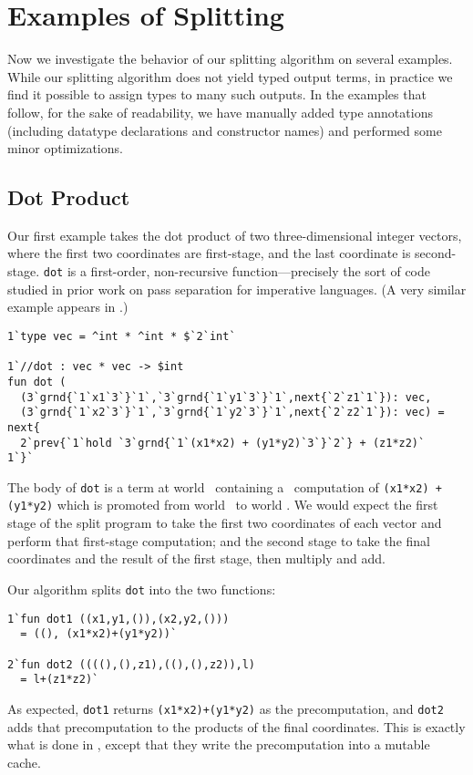  \section{Examples of Splitting}
\label{sec:examples}

Now we investigate the behavior of our splitting algorithm on several examples.
While our splitting algorithm does not yield typed output terms, in practice we
find it possible to assign types to many such outputs. In the examples that
follow, for the sake of readability, we have manually added type annotations
(including datatype declarations and constructor names) and performed some minor
optimizations.

\subsection{Dot Product}

Our first example takes the dot product of two three-dimensional integer
vectors, where the first two coordinates are first-stage, and the last
coordinate is second-stage. \texttt{dot} is a first-order, non-recursive
function---precisely the sort of code studied in prior work on pass separation
for imperative languages. (A very similar example appears in \cite{knoblock96}.)
%
\begin{lstlisting} 
1`type vec = ^int * ^int * $`2`int`

1`//dot : vec * vec -> $int
fun dot (
  (3`grnd{`1`x1`3`}`1`,`3`grnd{`1`y1`3`}`1`,next{`2`z1`1`}): vec,
  (3`grnd{`1`x2`3`}`1`,`3`grnd{`1`y2`3`}`1`,next{`2`z2`1`}): vec) = 
next{
  2`prev{`1`hold `3`grnd{`1`(x1*x2) + (y1*y2)`3`}`2`} + (z1*z2)`
1`}`
\end{lstlisting}
%
The body of \texttt{dot} is a \rmint{} term at world \bbtwo\ containing a
\rmint\ computation of \texttt{(x1*x2) + (y1*y2)} which is promoted from world
\bbonep\ to world \bbtwo. We would expect the first stage of the split program
to take the first two coordinates of each vector and perform that first-stage
computation; and the second stage to take the final coordinates and the result
of the first stage, then multiply and add.

Our algorithm splits \texttt{dot} into the two functions:
%
\begin{lstlisting} 
1`fun dot1 ((x1,y1,()),(x2,y2,())) 
  = ((), (x1*x2)+(y1*y2))`

2`fun dot2 ((((),(),z1),((),(),z2)),l) 
  = l+(z1*z2)`
\end{lstlisting}
%
As expected, \texttt{dot1} returns \texttt{(x1*x2)+(y1*y2)} as the
precomputation, and \texttt{dot2} adds that precomputation to the products of
the final coordinates. This is exactly what is done in \cite{knoblock96}, except
that they write the precomputation into a mutable cache.

